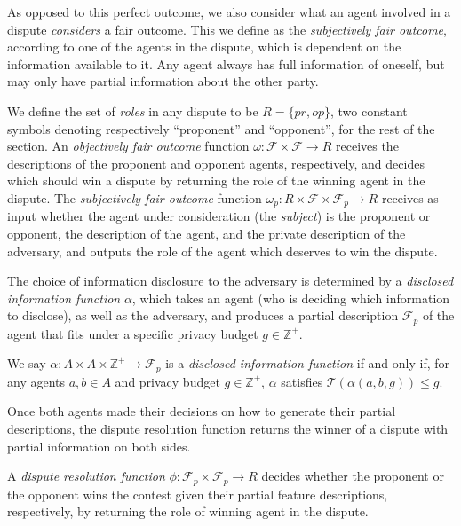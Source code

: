\documentclass[acmsmall]{custom-arxiv}  %
\begin{document}
As opposed to this perfect outcome, we also consider what an agent involved in a dispute \textit{considers} a fair outcome. This we define as the \textit{subjectively fair outcome}, according to one of the agents in the dispute, which is dependent on the information available to it. Any agent always has full information of oneself, but may only have partial information about the other party.

\begin{definition}
  We define the set of \textit{roles} in any dispute to be $R = \{pr, op\}$, two constant symbols denoting respectively ``proponent'' and ``opponent'', for the rest of the section. An \textit{objectively fair outcome} function $\omega: \mathcal{F} \times \mathcal{F} \rightarrow R$ receives the descriptions of the proponent and opponent agents, respectively, and decides which should win a dispute by returning the role of the winning agent in the dispute. %
  The \textit{subjectively fair outcome} function $\omega_p: R \times \mathcal{F} \times \mathcal{F}_p \rightarrow R$ receives as input whether the agent under consideration (the \textit{subject}) is the proponent or opponent, the description of the agent, and the private description of the adversary, and outputs the role of the agent which deserves to win the dispute.
\end{definition}

The choice of information disclosure to the adversary is determined by a \textit{disclosed information function} $\alpha$, which takes an agent (who is deciding which information to disclose), as well as the adversary, and produces a partial description $\mathcal{F}_p$ of the agent that fits under a specific privacy budget $g \in \mathbb{Z}^{+}$. 

\begin{definition}
We say $\alpha: A \times A \times \mathbb{Z}^{+} \rightarrow \mathcal{F}_p$ is a \textit{disclosed information function} if and only if, for any agents $a, b \in A$ and privacy budget $g \in \mathbb{Z}^{+}$, $\alpha$ satisfies $\mathcal{T}(\alpha(a, b, g)) \leq g$.
\end{definition}



Once both agents made their decisions on how to generate their partial descriptions, the dispute resolution function returns the winner of a dispute with partial information on both sides.

\begin{definition}
A \textit{dispute resolution function} $\phi: \mathcal{F}_p \times \mathcal{F}_p \rightarrow R$ decides whether the proponent or the opponent wins the contest given their partial feature descriptions, respectively, by returning the role of winning agent in the dispute.
\end{definition}
\end{document}
